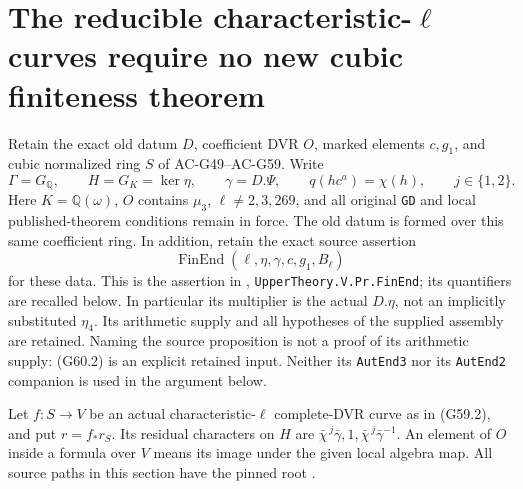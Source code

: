 \section{The reducible characteristic-\(\ell\) curves require no new cubic finiteness theorem}
\label{sec:cubic-typeii-curve-exclusion}

Retain the exact old datum \(D\), coefficient DVR \(O\),
marked elements \(c,g_1\), and cubic normalized ring \(S\)
of AC-G49--AC-G59.  Write
\[
 \Gamma=G_{\mathbb Q},\qquad H=G_K=\ker\eta,
 \qquad \gamma=D.\Psi,\qquad
 q(hc^a)=\chi(h),\qquad j\in\{1,2\}.
 \tag{G60.1}
\]
Here \(K=\mathbb Q(\omega)\), \(O\) contains \(\mu_3\),
\(\ell\ne2,3,269\), and all original \texttt{GD} and local
published-theorem conditions remain in force.
The old datum is formed over this same coefficient ring.
In addition, retain the exact source assertion
\[
 \operatorname{FinEnd}(\ell,\eta,\gamma,c,g_1,B_\ell)
 \tag{G60.2}
\]
for these data.  This is the assertion in
,
\texttt{UpperTheory.V.Pr.FinEnd}; its quantifiers are
recalled below.  In particular its multiplier is the
actual \(D.\eta\), not an implicitly substituted
\(\eta_4\).  Its arithmetic supply and all hypotheses of
the supplied assembly are retained.
Naming the source proposition is not a proof of its
arithmetic supply: (G60.2) is an explicit retained input.
Neither its \texttt{AutEnd3} nor its \texttt{AutEnd2}
companion is used in the argument below.

Let \(f:S\to V\) be an actual characteristic-\(\ell\)
complete-DVR curve as in (G59.2), and put \(r=f_*r_S\).
Its residual characters on \(H\) are
\(\bar\chi^{\,j}\bar\gamma,1,
\bar\chi^{\,j}\bar\gamma^{-1}\).
An element of \(O\) inside a formula over \(V\) means its
image under the given local algebra map.
All source paths in this section have the pinned root
.

